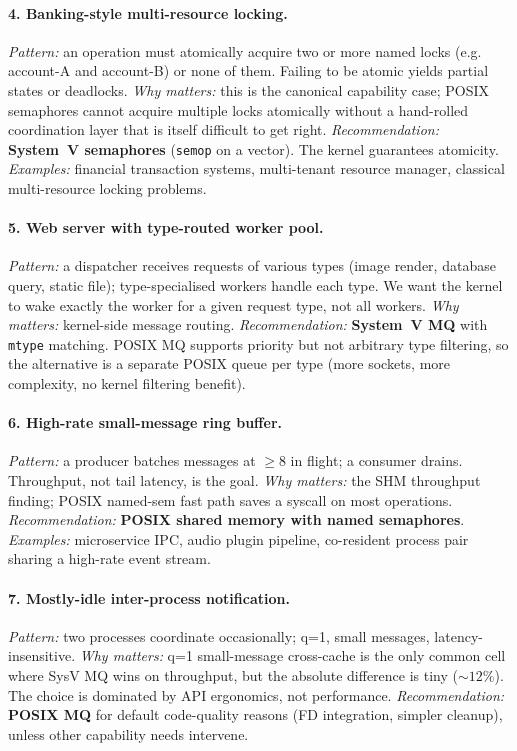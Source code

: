 \documentclass[a4paper,11pt]{article}
\begin{document}
\paragraph{4. Banking-style multi-resource locking.}
\textit{Pattern:} an operation must atomically acquire two or more
named locks (e.g. account-A and account-B) or none of them. Failing
to be atomic yields partial states or deadlocks.\quad
\textit{Why matters:} this is the canonical capability case; POSIX
semaphores cannot acquire multiple locks atomically without a
hand-rolled coordination layer that is itself difficult to get
right.\quad
\textit{Recommendation:} \textbf{System~V semaphores} (\texttt{semop}
on a vector). The kernel guarantees atomicity.\quad
\textit{Examples:} financial transaction systems, multi-tenant
resource manager, classical multi-resource locking problems.

\paragraph{5. Web server with type-routed worker pool.}
\textit{Pattern:} a dispatcher receives requests of various types
(image render, database query, static file); type-specialised
workers handle each type. We want the kernel to wake exactly the
worker for a given request type, not all workers.\quad
\textit{Why matters:} kernel-side message routing.\quad
\textit{Recommendation:} \textbf{System~V MQ} with \texttt{mtype}
matching. POSIX MQ supports priority but not arbitrary type
filtering, so the alternative is a separate POSIX queue per type
(more sockets, more complexity, no kernel filtering benefit).

\paragraph{6. High-rate small-message ring buffer.}
\textit{Pattern:} a producer batches messages at $\geq$8 in flight;
a consumer drains. Throughput, not tail latency, is the goal.\quad
\textit{Why matters:} the SHM throughput finding; POSIX named-sem
fast path saves a syscall on most operations.\quad
\textit{Recommendation:} \textbf{POSIX shared memory with named
semaphores}.\quad
\textit{Examples:} microservice IPC, audio plugin pipeline,
co-resident process pair sharing a high-rate event stream.

\paragraph{7. Mostly-idle inter-process notification.}
\textit{Pattern:} two processes coordinate occasionally; q=1, small
messages, latency-insensitive.\quad
\textit{Why matters:} q=1 small-message cross-cache is the only
common cell where SysV MQ wins on throughput, but the absolute
difference is tiny ($\sim 12\%$). The choice is dominated by API
ergonomics, not performance.\quad
\textit{Recommendation:} \textbf{POSIX MQ} for default code-quality
reasons (FD integration, simpler cleanup), unless other capability
needs intervene.
\end{document}
